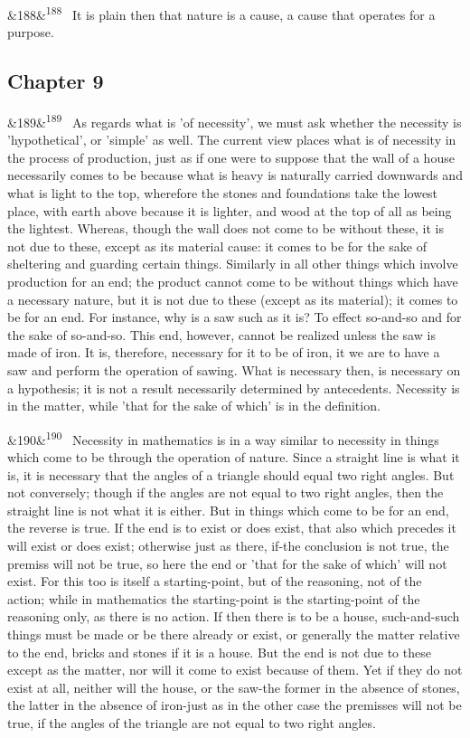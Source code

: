 \documentclass[12pt]{article}
\newcommand{\para}[1][]{\par\noindent\ifx&#1&\else\textsuperscript{\footnotesize #1}~\fi}
\begin{document}
\para[188] It is plain then that nature is a cause, a cause that operates for a purpose.

\subsection*{Chapter 9}

\para[189] As regards what is 'of necessity', we must ask whether the necessity is 'hypothetical', or 'simple' as well. The current view places what is of necessity in the process of production, just as if one were to suppose that the wall of a house necessarily comes to be because what is heavy is naturally carried downwards and what is light to the top, wherefore the stones and foundations take the lowest place, with earth above because it is lighter, and wood at the top of all as being the lightest. Whereas, though the wall does not come to be without these, it is not due to these, except as its material cause: it comes to be for the sake of sheltering and guarding certain things. Similarly in all other things which involve production for an end; the product cannot come to be without things which have a necessary nature, but it is not due to these (except as its material); it comes to be for an end. For instance, why is a saw such as it is? To effect so-and-so and for the sake of so-and-so. This end, however, cannot be realized unless the saw is made of iron. It is, therefore, necessary for it to be of iron, it we are to have a saw and perform the operation of sawing. What is necessary then, is necessary on a hypothesis; it is not a result necessarily determined by antecedents. Necessity is in the matter, while 'that for the sake of which' is in the definition.

\para[190] Necessity in mathematics is in a way similar to necessity in things which come to be through the operation of nature. Since a straight line is what it is, it is necessary that the angles of a triangle should equal two right angles. But not conversely; though if the angles are not equal to two right angles, then the straight line is not what it is either. But in things which come to be for an end, the reverse is true. If the end is to exist or does exist, that also which precedes it will exist or does exist; otherwise just as there, if-the conclusion is not true, the premiss will not be true, so here the end or 'that for the sake of which' will not exist. For this too is itself a starting-point, but of the reasoning, not of the action; while in mathematics the starting-point is the starting-point of the reasoning only, as there is no action. If then there is to be a house, such-and-such things must be made or be there already or exist, or generally the matter relative to the end, bricks and stones if it is a house. But the end is not due to these except as the matter, nor will it come to exist because of them. Yet if they do not exist at all, neither will the house, or the saw-the former in the absence of stones, the latter in the absence of iron-just as in the other case the premisses will not be true, if the angles of the triangle are not equal to two right angles.
\end{document}
